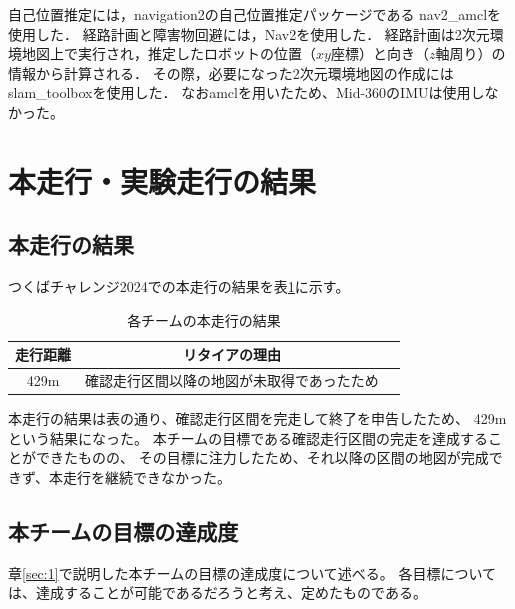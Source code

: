 \documentclass[twocolumn,9pt]{jsproceedings}
\begin{document}
自己位置推定には，navigation2の自己位置推定パッケージである
nav2\_amclを使用した\cite{nav2_amcl}．
経路計画と障害物回避には，Nav2を使用した\cite{nav2}．
経路計画は2次元環境地図上で実行され，推定したロボットの位置（$xy$座標）と向き（$z$軸周り）の情報から計算される．
その際，必要になった2次元環境地図の作成にはslam\_toolbox\cite{slam_toolbox}を使用した．
なおamclを用いたため、Mid-360のIMUは使用しなかった。

\section{本走行・実験走行の結果}
\subsection{本走行の結果}

つくばチャレンジ2024での本走行の結果を表\ref{MainRun}に示す。

\begin{table}[H]
  \caption{各チームの本走行の結果}
  \label{MainRun}
  \begin{tabular}{|c|c|p{4.0cm}|}
    \hline
    走行距離 & リタイアの理由                                                                                             \\
    \hline
    429m   & 確認走行区間以降の地図が未取得であったため                                                           \\
    \hline
  \end{tabular}
\end{table}

本走行の結果は表の通り、確認走行区間を完走して終了を申告したため、
429mという結果になった。
本チームの目標である確認走行区間の完走を達成することができたものの、
その目標に注力したため、それ以降の区間の地図が完成できず、本走行を継続できなかった。

\subsection{本チームの目標の達成度}

章\ref{sec:1}で説明した本チームの目標の達成度について述べる。
各目標については、達成することが可能であるだろうと考え、定めたものである。
\end{document}
